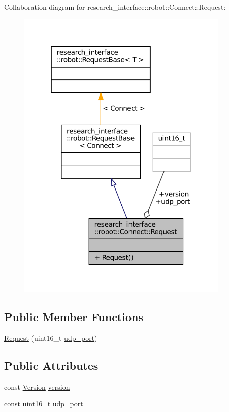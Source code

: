 Collaboration diagram for research\+\_\+interface\+:\+:robot\+:\+:Connect\+:\+:Request\+:
\nopagebreak
\begin{figure}[H]
\begin{center}
\leavevmode
\includegraphics[width=286pt]{structresearch__interface_1_1robot_1_1Connect_1_1Request__coll__graph}
\end{center}
\end{figure}
\subsection*{Public Member Functions}
\begin{DoxyCompactItemize}
\item 
\hyperlink{structresearch__interface_1_1robot_1_1Connect_1_1Request_a6a37ef382008c0c62d216511aa17fd1c}{Request} (uint16\+\_\+t \hyperlink{structresearch__interface_1_1robot_1_1Connect_1_1Request_acb5f441cd6972e37a8a18e5b579b079a}{udp\+\_\+port})
\end{DoxyCompactItemize}
\subsection*{Public Attributes}
\begin{DoxyCompactItemize}
\item 
const \hyperlink{namespaceresearch__interface_1_1robot_aa7a53d2c58ee4f7aa706b905ddcc7d47}{Version} \hyperlink{structresearch__interface_1_1robot_1_1Connect_1_1Request_a006e8004379eb2b329bb9388c76a5399}{version}
\item 
const uint16\+\_\+t \hyperlink{structresearch__interface_1_1robot_1_1Connect_1_1Request_acb5f441cd6972e37a8a18e5b579b079a}{udp\+\_\+port}
\end{DoxyCompactItemize}


